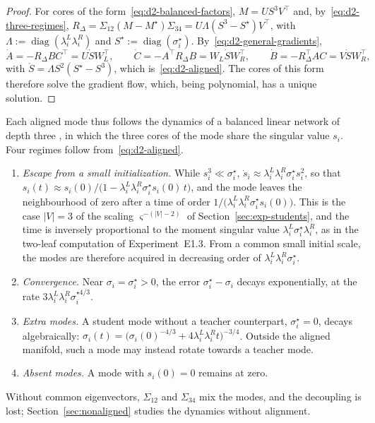 \documentclass[11pt]{article}
\newcommand{\diag}{\operatorname{diag}}
\theoremstyle{definition}
\numberwithin{equation}{section}
\begin{document}
\begin{proof}
For cores of the form~\eqref{eq:d2-balanced-factors}, $M=US^3V^\top$ and, by~\eqref{eq:d2-three-regimes}, $R_\Delta=\Sigma_{12}(M-M^\star)\Sigma_{34}=U\Lambda(S^3-S^\star)V^\top$, with $\Lambda:=\diag(\lambda^L_i\lambda^R_i)$ and $S^\star:=\diag(\sigma^\star_i)$. By~\eqref{eq:d2-general-gradients},
\[
\dot A=-R_\Delta BC^\top=U\dot SW_L^\top,\qquad\dot C=-A^\top R_\Delta B=W_L\dot SW_R^\top,\qquad\dot B=-R_\Delta^\top AC=V\dot SW_R^\top,
\]
with $\dot S=\Lambda S^2(S^\star-S^3)$, which is~\eqref{eq:d2-aligned}. The cores of this form therefore solve the gradient flow, which, being polynomial, has a unique solution.
\end{proof}

Each aligned mode thus follows the dynamics of a balanced linear network of depth three \citep{saxe2014exact}, in which the three cores of the mode share the singular value $s_i$. Four regimes follow from~\eqref{eq:d2-aligned}.
\begin{enumerate}[label=(\roman*),nosep]
\item \emph{Escape from a small initialization.} While $s_i^3\ll\sigma^\star_i$, $\dot s_i\approx\lambda^L_i\lambda^R_i\sigma^\star_is_i^2$, so that $s_i(t)\approx s_i(0)/\big(1-\lambda^L_i\lambda^R_i\sigma^\star_is_i(0)\,t\big)$, and the mode leaves the neighbourhood of zero after a time of order $1/\big(\lambda^L_i\lambda^R_i\sigma^\star_is_i(0)\big)$. This is the case $|V|=3$ of the scaling $\varsigma^{-(|V|-2)}$ of Section~\ref{sec:exp-students}, and the time is inversely proportional to the moment singular value $\lambda^L_i\sigma^\star_i\lambda^R_i$, as in the two-leaf computation of Experiment~E1.3. From a common small initial scale, the modes are therefore acquired in decreasing order of $\lambda^L_i\lambda^R_i\sigma^\star_i$.
\item \emph{Convergence.} Near $\sigma_i=\sigma^\star_i>0$, the error $\sigma^\star_i-\sigma_i$ decays exponentially, at the rate $3\lambda^L_i\lambda^R_i\sigma^{\star4/3}_i$.
\item \emph{Extra modes.} A student mode without a teacher counterpart, $\sigma^\star_i=0$, decays algebraically: $\sigma_i(t)=\big(\sigma_i(0)^{-4/3}+4\lambda^L_i\lambda^R_it\big)^{-3/4}$. Outside the aligned manifold, such a mode may instead rotate towards a teacher mode.
\item \emph{Absent modes.} A mode with $s_i(0)=0$ remains at zero.
\end{enumerate}
Without common eigenvectors, $\Sigma_{12}$ and $\Sigma_{34}$ mix the modes, and the decoupling is lost; Section~\ref{sec:nonaligned} studies the dynamics without alignment.
\end{document}
